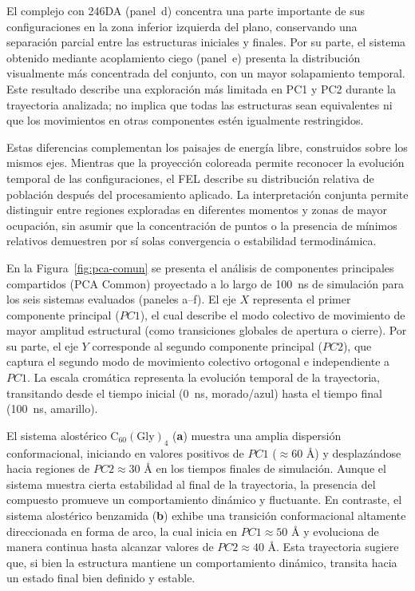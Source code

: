 El complejo con 246DA (panel~d) concentra una parte importante de sus configuraciones en la zona inferior izquierda del plano, conservando una separación parcial entre las estructuras iniciales y finales. Por su parte, el sistema obtenido mediante acoplamiento ciego (panel~e) presenta la distribución visualmente más concentrada del conjunto, con un mayor solapamiento temporal. Este resultado describe una exploración más limitada en PC1 y PC2 durante la trayectoria analizada; no implica que todas las estructuras sean equivalentes ni que los movimientos en otras componentes estén igualmente restringidos.

Estas diferencias complementan los paisajes de energía libre, construidos sobre los mismos ejes. Mientras que la proyección coloreada permite reconocer la evolución temporal de las configuraciones, el FEL describe su distribución relativa de población después del procesamiento aplicado. La interpretación conjunta permite distinguir entre regiones exploradas en diferentes momentos y zonas de mayor ocupación, sin asumir que la concentración de puntos o la presencia de mínimos relativos demuestren por sí solas convergencia o estabilidad termodinámica.

En la Figura~\ref{fig:pca-comun} se presenta el análisis de componentes principales compartidos (PCA Common) proyectado a lo largo de 100~ns de simulación para los seis sistemas evaluados (paneles a--f). El eje $X$ representa el primer componente principal ($PC1$), el cual describe el modo colectivo de movimiento de mayor amplitud estructural (como transiciones globales de apertura o cierre). Por su parte, el eje $Y$ corresponde al segundo componente principal ($PC2$), que captura el segundo modo de movimiento colectivo ortogonal e independiente a $PC1$. La escala cromática representa la evolución temporal de la trayectoria, transitando desde el tiempo inicial (0~ns, morado/azul) hasta el tiempo final (100~ns, amarillo).

El sistema alostérico $\text{C}_{60}(\text{Gly})_4$ (\textbf{a}) muestra una amplia dispersión conformacional, iniciando en valores positivos de $PC1$ ($\approx 60\text{ \AA}$) y desplazándose hacia regiones de $PC2 \approx 30\text{ \AA}$ en los tiempos finales de simulación. Aunque el sistema muestra cierta estabilidad al final de la trayectoria, la presencia del compuesto promueve un comportamiento dinámico y fluctuante. En contraste, el sistema alostérico benzamida (\textbf{b}) exhibe una transición conformacional altamente direccionada en forma de arco, la cual inicia en $PC1 \approx 50\text{ \AA}$ y evoluciona de manera continua hasta alcanzar valores de $PC2 \approx 40\text{ \AA}$. Esta trayectoria sugiere que, si bien la estructura mantiene un comportamiento dinámico, transita hacia un estado final bien definido y estable.

